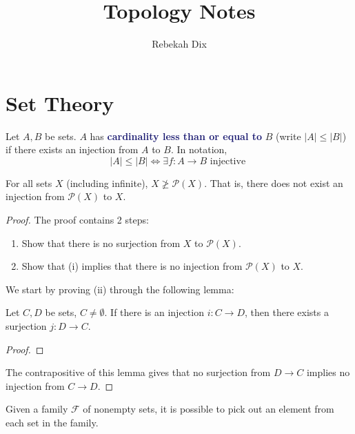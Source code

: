 \documentclass[11pt]{article}
\title{Topology Notes}
\author{Rebekah Dix}
\numberwithin{equation}{section}
\newcommand{\navy}[1]{\textcolor{MidnightBlue}{\bf #1}}
\newcounter{theo}[section]\setcounter{theo}{0}
\theoremstyle{definition}
\theoremstyle{definition}
\newcommand\abs[1]{\left| #1 \right|}
\newcommand{\1}{\mathbbm 1}
\newcommand{\pP}{\mathcal P}
\newcommand{\fF}{\mathcal F}
\begin{document}
\maketitle
\tableofcontents
\newpage 

\listoftodos
\newpage

\section{Set Theory}

\begin{definition}
	Let $A, B$ be sets. $A$ has \navy{cardinality less than or equal to} $B$ (write $\abs{A} \leq \abs{B}$) if there exists an injection from $A$ to $B$. In notation,
	\begin{equation}
		\abs{A} \leq \abs{B} \iff \exists f:A \to B \text{ injective }
	\end{equation} 
\end{definition}

\begin{theorem}[Cantor]
	For all sets $X$ (including infinite), $X \not\geq \pP(X)$. That is, there does not exist an injection from $\pP(X)$ to $X$. 
\end{theorem}
\begin{proof}
	The proof contains 2 steps:
	\begin{enumerate}
		\item Show that there is no surjection from $X$ to $\pP(X)$. 
		\item Show that (i) implies that there is no injection from $\pP(X)$ to $X$. 
	\end{enumerate}

	We start by proving (ii) through the following lemma:
	\begin{lemma}
		Let $C,D$ be sets, $C \neq \emptyset$. If there is an injection $i:C \to D$, then there exists a surjection $j: D \to C$. 
	\end{lemma}
	\begin{proof}
		
	\end{proof}
	The contrapositive of this lemma gives that no surjection from $D \to C$ implies no injection from $C \to D$. 
\end{proof}

\begin{theorem}
	Given a family $\fF$ of nonempty sets, it is possible to pick out an element from each set in the family. 
\end{theorem}
\end{document}
